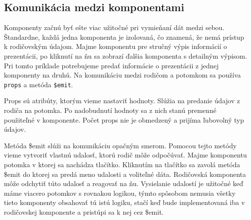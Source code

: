 \subsection*{Komunikácia medzi komponentami}
Komponenty začnú byť ešte viac užitočné pri vymieňaní dát medzi sebou. Štandardne, každá jedna komponenta je izolovaná, čo znamená, že nemá prístup k rodičovským údajom. Majme komponentu pre stručný výpis informácií o prezentácii, po kliknutí na ňu sa zobrazí ďalšia komponenta s detailným výpisom. Pri tomto príklade potrebujeme predať informácie o prezentácii z jednej komponenty na druhú. Na komunikáciu medzi rodičom a potomkom sa používa \texttt{props} a metóda \texttt{\$emit}.

Props sú atribúty, ktorým vieme nastaviť hodnoty. Slúžia na predanie údajov z rodiča na potomka. Po nadobudnutí hodnoty sa z nich stanú premenné použiteľné v komponente. Počet props nie je obmedzený a prijíma ľubovolný typ údajov.

Metóda \$emit slúži na komunikáciu opačným smerom. Pomocou tejto metódy vieme vytvoriť vlastnú udalosť, ktorú rodič môže odpočúvať. Majme komponentu potomka v ktorej sa nachádza tlačítko. Kliknutím na tlačítko sa zavolá metóda \$emit do ktorej sa predá meno udalosti a voliteľné dáta. Rodičovská komponenta môže odchytiť túto udalosť a reagovať na ňu. Vysielanie udalostí je užitočné keď máme viacero potomkov s rovnakou logikou, týmto spôsobom nemusia všetky tieto komponenty obsahovať tú istú logiku, stačí keď bude implementovaná iba v rodičovskej komponente a pristúpi sa k nej cez \$emit.

